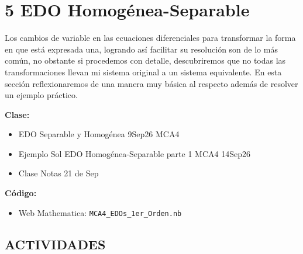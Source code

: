 \section{5 EDO Homogénea-Separable}

\begin{tcolorbox}[enunciado]
Los cambios de variable en las ecuaciones diferenciales para transformar la forma en que está expresada una, logrando así facilitar su resolución son de lo más común, no obstante si procedemos con detalle, descubriremos que no todas las transformaciones llevan mi sistema original a un sistema equivalente. En esta sección reflexionaremos de una manera muy básica al respecto además de resolver un ejemplo práctico.

\vspace{0.2cm}
\textbf{Clase:}
\begin{itemize}[leftmargin=*]
    \item EDO Separable y Homogénea 9Sep26 MCA4
    \item Ejemplo Sol EDO Homogénea-Separable parte 1 MCA4 14Sep26
    \item Clase Notas 21 de Sep
\end{itemize}

\textbf{Código:}
\begin{itemize}[leftmargin=*]
    \item Web Mathematica: \texttt{MCA4\_EDOs\_1er\_Orden.nb}
\end{itemize}
\end{tcolorbox}

\subsection*{ACTIVIDADES}

